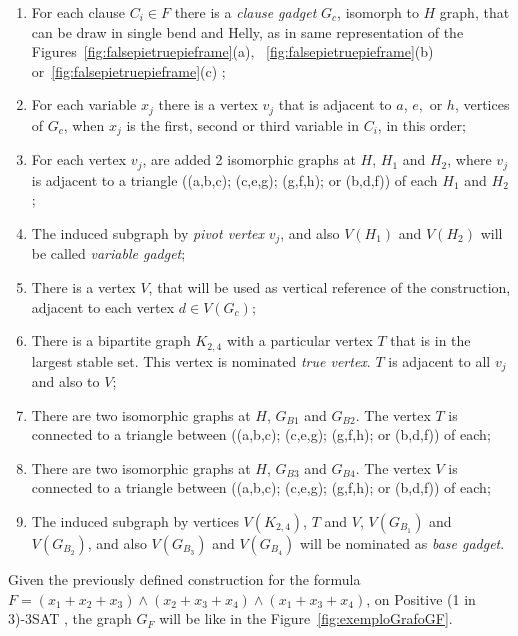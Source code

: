 \documentclass[a4paper,11pt]{article}
\begin{document}
\begin{enumerate}
\item For each clause $C_i \in F$ there is a  \textit{clause gadget} $G_{c}$, isomorph to $H$ graph, that can be draw in single bend and Helly, as in same representation of the Figures~\ref{fig:falsepietruepieframe}(a), ~\ref{fig:falsepietruepieframe}(b) or~\ref{fig:falsepietruepieframe}(c)  ;

\item For each variable $x_{j}$ there is a vertex $v_{j}$ that is adjacent to $a$, $e,$ or $h$, vertices of $G_c$, when $x_{j}$ is the first, second or third variable in $C_i$, in this order;

\item For each vertex $v_{j}$, are added 2 isomorphic graphs  at $H$, $H_1$ and $H_2$, where $v_{j}$ is  adjacent to a triangle ((a,b,c); (c,e,g); (g,f,h); or (b,d,f)) of each $H_1$ and $H_2$; 

\item The induced subgraph by \emph{pivot vertex}  $v_{j}$, and also $V(H_1)$ and $V(H_2)$ will be called \emph{variable gadget}; 

\item There is a vertex $V$, that will be used as vertical reference of the construction, adjacent to each vertex  $d \in V(G_c)$;

\item There is a bipartite graph $K_{2,4}$ with a particular vertex $T$ that is in the largest stable set. This vertex is nominated \emph{true vertex}. $T$ is adjacent to all $v_{j}$ and also to $V$;

\item There are two isomorphic graphs at $H$, $G_{B1}$ and $G_{B2}$. The vertex $T$ is connected to a triangle between ((a,b,c); (c,e,g); (g,f,h); or (b,d,f)) of each;


\item There are two isomorphic graphs at $H$, $G_{B3}$ and $G_{B4}$. The vertex $V$ is connected to a triangle between ((a,b,c); (c,e,g); (g,f,h); or (b,d,f)) of each;

\item The induced subgraph by vertices $V(K_{2,4})$, $T$ and $V$,  $V(G_{B_1})$ and $V(G_{B_2})$, and also $V(G_{B_3})$ and $V(G_{B_4})$ will be nominated as \emph{base gadget}. 
\end{enumerate}


Given the previously defined construction for the formula $ F = (x_1 + x_2 + x_3) \wedge (x_2 + x_3 + x_4) \wedge (x_1 + x_3 + x_4) $, on {\sc Positive (1 in 3)-3SAT }, the graph $ G_F $ will be like in the Figure~\ref{fig:exemploGrafoGF}.
\end{document}
